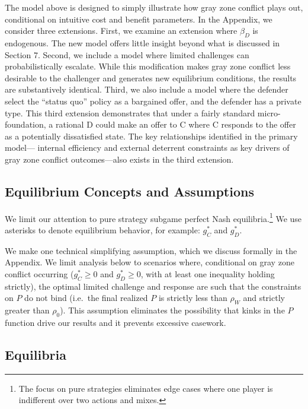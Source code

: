 \documentclass[
]{article}
\begin{document}
The model above is designed to simply illustrate how gray zone conflict plays out, conditional on intuitive cost and benefit parameters. In the Appendix, we consider three extensions. First, we examine an extension where \(\beta_{D}\) is endogenous. The new model offers little insight beyond what is discussed in Section 7. Second, we include a model where limited challenges can probabilistically escalate. While this modification makes gray zone conflict less desirable to the challenger and generates new equilibrium conditions, the results are substantively identical. Third, we also include a model where the defender select the ``status quo'' policy as a bargained offer, and the defender has a private type. This third extension demonstrates that under a fairly standard micro-foundation, a rational D could make an offer to C where C responds to the offer as a potentially dissatisfied state. The key relationships identified in the primary model--- internal efficiency and external deterrent constraints as key drivers of gray zone conflict outcomes---also exists in the third extension.

\hypertarget{equilibrium-concepts-and-assumptions}{%
\subsection{Equilibrium Concepts and Assumptions}\label{equilibrium-concepts-and-assumptions}}

We limit our attention to pure strategy subgame perfect Nash equilibria.\footnote{The focus on pure strategies eliminates edge cases where one player is indifferent over two actions and mixes.} We use asterisks to denote equilibrium behavior, for example: \(g_{C}^{*}\) and \(g_{D}^{*}\).

We make one technical simplifying assumption, which we discuss formally in the Appendix. We limit analysis below to scenarios where, conditional on gray zone conflict occurring (\(g_{C}^{*}\geq 0\) and \(g_{D}^{*}\geq 0\), with at least one inequality holding strictly), the optimal limited challenge and response are such that the constraints on \(P\) do not bind (i.e.~the final realized \(P\) is strictly less than \(\rho_W\) and strictly greater than \(\rho_{0}\)). This assumption eliminates the possibility that kinks in the \(P\) function drive our results and it prevents excessive casework.

\hypertarget{equilibria}{%
\subsection{Equilibria}\label{equilibria}}
\end{document}
